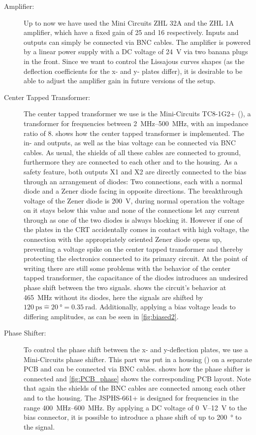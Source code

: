 \begin{description}
	\item[Amplifier:] Up to now we have used the Mini Circuits ZHL 32A \cite{MiniCircuits2021a}  and the ZHL 1A \cite{MiniCircuits2021} amplifier, which have a fixed gain of 25 and 16 respectively. Inputs and outputs can simply be connected via BNC cables. The amplifier is powered by a linear power supply with a DC voltage of \SI{24}{\volt} via two banana plugs in the front. Since we want to control the Lissajous curves shapes (as the deflection coefficients for the x- and y- plates differ), it is desirable to be able to adjust the amplifier gain in future versions of the setup. 
	
	\item[Center Tapped Transformer:] The center tapped transformer we use is the Mini-Circuits TC8-1G2+ (\cite{TC8-1G2}), a transformer for frequencies between \SIrange{2}{500}{\mega\hertz}, with an impedance ratio of 8.  shows how the center tapped transformer is implemented. The in- and outputs, as well as the bias voltage can be connected via BNC cables. As usual, the shields of all these cables are connected to ground, furthermore they are connected to each other and to the housing. As a safety feature, both outputs X1 and X2 are directly connected to the bias through an arrangement of diodes: Two connections, each with a normal diode and a Zener diode facing in opposite directions. The breakthrough voltage of the Zener diode is \SI{200}{\volt}, during normal operation the voltage on it stays below this value and none of the connections let any current through as one of the two diodes is always blocking it. However if one of the plates in the CRT accidentally comes in contact with high voltage, the connection with the appropriately oriented Zener diode opens up, preventing a voltage spike on the center tapped transformer and thereby protecting the electronics connected to its primary circuit.
	At the point of writing there are still some problems with the behavior of the center tapped transformer, the capacitance of the diodes introduces an undesired phase shift between the two signals.  shows the circuit's behavior at \SI{465}{\mega\hertz} without its diodes, here the signals are shifted by $\SI{120}{\pico\second} \mathrel{\widehat{=}} \SI{20}{\degree} = \SI{0.35}{\radian}$. Additionally, applying a bias voltage leads to differing amplitudes, as can be seen in \cref{fig:biased2}.
	
	\item[Phase Shifter:] To control the phase shift between the x- and y-deflection plates, we use a Mini-Circuits \cite{JSPHS-661} phase shifter. This part was put in a  housing (\cite{Hammond1455D601RD}) on a separate PCB and can be connected via BNC cables.  shows how the phase shifter is connected and \cref{fig:PCB_phase} shows the corresponding PCB layout. Note that again the shields of the BNC cables are connected among each other and to the housing. The JSPHS-661+ is designed for frequencies in the range \SIrange{400}{600}{\mega\hertz}. By applying a DC voltage of \SIrange{0}{12}{\volt} to the bias connector, it is possible to introduce a phase shift of up to \SI{200}{\degree} to the signal.
	

\end{description}
